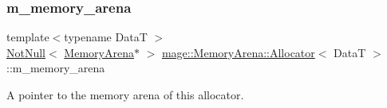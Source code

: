 \subsubsection{\texorpdfstring{m\+\_\+memory\+\_\+arena}{m\_memory\_arena}}
{\footnotesize\ttfamily template$<$typename DataT $>$ \\
\hyperlink{namespacemage_a8769f9d670d6b585ea306cb1062af94b}{Not\+Null}$<$ \hyperlink{classmage_1_1_memory_arena}{Memory\+Arena}$\ast$ $>$ \hyperlink{classmage_1_1_memory_arena_1_1_allocator}{mage\+::\+Memory\+Arena\+::\+Allocator}$<$ DataT $>$\+::m\+\_\+memory\+\_\+arena\hspace{0.3cm}{\ttfamily [private]}}

A pointer to the memory arena of this allocator. 